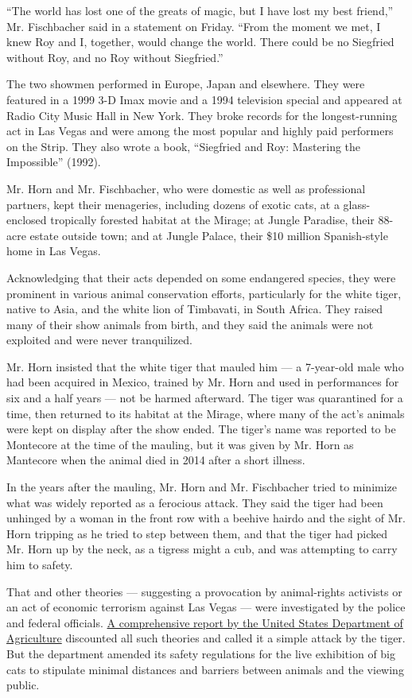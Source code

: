 ``The world has lost one of the greats of magic, but I have lost my best
friend,'' Mr. Fischbacher said in a statement on Friday. ``From the
moment we met, I knew Roy and I, together, would change the world. There
could be no Siegfried without Roy, and no Roy without Siegfried.''

The two showmen performed in Europe, Japan and elsewhere. They were
featured in a 1999 3-D Imax movie and a 1994 television special and
appeared at Radio City Music Hall in New York. They broke records for
the longest-running act in Las Vegas and were among the most popular and
highly paid performers on the Strip. They also wrote a book, ``Siegfried
and Roy: Mastering the Impossible'' (1992).

Mr. Horn and Mr. Fischbacher, who were domestic as well as professional
partners, kept their menageries, including dozens of exotic cats, at a
glass-enclosed tropically forested habitat at the Mirage; at Jungle
Paradise, their 88-acre estate outside town; and at Jungle Palace, their
\$10 million Spanish-style home in Las Vegas.

Acknowledging that their acts depended on some endangered species, they
were prominent in various animal conservation efforts, particularly for
the white tiger, native to Asia, and the white lion of Timbavati, in
South Africa. They raised many of their show animals from birth, and
they said the animals were not exploited and were never tranquilized.

Mr. Horn insisted that the white tiger that mauled him --- a 7-year-old
male who had been acquired in Mexico, trained by Mr. Horn and used in
performances for six and a half years --- not be harmed afterward. The
tiger was quarantined for a time, then returned to its habitat at the
Mirage, where many of the act's animals were kept on display after the
show ended. The tiger's name was reported to be Montecore at the time of
the mauling, but it was given by Mr. Horn as Mantecore when the animal
died in 2014 after a short illness.

In the years after the mauling, Mr. Horn and Mr. Fischbacher tried to
minimize what was widely reported as a ferocious attack. They said the
tiger had been unhinged by a woman in the front row with a beehive
hairdo and the sight of Mr. Horn tripping as he tried to step between
them, and that the tiger had picked Mr. Horn up by the neck, as a
tigress might a cub, and was attempting to carry him to safety.

That and other theories --- suggesting a provocation by animal-rights
activists or an act of economic terrorism against Las Vegas --- were
investigated by the police and federal officials.
\href{https://www.cbsnews.com/news/roy-horn-tiger-mauling-case-closed/}{A
comprehensive report by the United States Department of Agriculture}
discounted all such theories and called it a simple attack by the tiger.
But the department amended its safety regulations for the live
exhibition of big cats to stipulate minimal distances and barriers
between animals and the viewing public.


